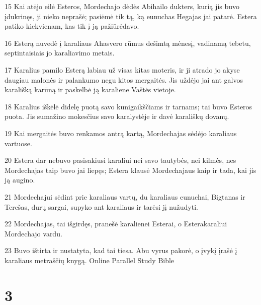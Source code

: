 \par 15 Kai atėjo eilė Esteros, Mordechajo dėdės Abihailo dukters, kurią jis buvo įdukrinęs, ji nieko neprašė; pasiėmė tik tą, ką eunuchas Hegajas jai patarė. Estera patiko kiekvienam, kas tik į ją pažiūrėdavo. 
\par 16 Esterą nuvedė į karaliaus Ahasvero rūmus dešimtą mėnesį, vadinamą tebetu, septintaisiais jo karaliavimo metais. 
\par 17 Karalius pamilo Esterą labiau už visas kitas moteris, ir ji atrado jo akyse daugiau malonės ir palankumo negu kitos mergaitės. Jis uždėjo jai ant galvos karališką karūną ir paskelbė ją karaliene Vaštės vietoje. 
\par 18 Karalius iškėlė didelę puotą savo kunigaikščiams ir tarnams; tai buvo Esteros puota. Jis sumažino mokesčius savo karalystėje ir davė karališkų dovanų. 
\par 19 Kai mergaitės buvo renkamos antrą kartą, Mordechajas sėdėjo karaliaus vartuose. 
\par 20 Estera dar nebuvo pasisakiusi karaliui nei savo tautybės, nei kilmės, nes Mordechajas taip buvo jai liepęs; Estera klausė Mordechajaus kaip ir tada, kai jis ją augino. 
\par 21 Mordechajui sėdint prie karaliaus vartų, du karaliaus eunuchai, Bigtanas ir Terešas, durų sargai, supyko ant karaliaus ir tarėsi jį nužudyti. 
\par 22 Mordechajas, tai išgirdęs, pranešė karalienei Esterai, o Estera­karaliui Mordechajo vardu. 
\par 23 Buvo ištirta ir nustatyta, kad tai tiesa. Abu vyrus pakorė, o įvykį įrašė į karaliaus metraščių knygą.
Online Parallel Study Bible



\chapter{3}

